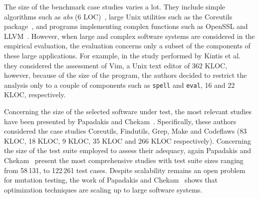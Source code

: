 
The size of the benchmark case studies varies a lot. They include simple algorithms such as \textit{abs} (6 LOC)~\cite{tokumoto2016muvm}, large Unix utilities such as the Coreutils package~\cite{hariri2019comparing,papadakis2018mutation,chekam2017empirical}, and programs implementing complex functions such as OpenSSL and LLVM~\cite{denisov2018mull}.
However, when large and complex software systems are considered in the empirical evaluation, the evaluation concerns only a subset of the components of these large applications.
For example, in the study performed by Kintis et al.~\cite{kintis2017detecting} they considered the assessment of Vim, a Unix text editor of 362 KLOC, however, because of the size of the program, the authors decided to restrict the analysis only to a couple of components such as \texttt{spell} and \texttt{eval}, 16 and 22 KLOC, respectively. 


Concerning the size of the selected software under test, the most relevant studies have been presented by Papadakis and Chekam~\cite{papadakis2018mutation,chekam2017empirical,papadakis2018mutant}. Specifically, these authors considered the case studies Coreutils, Findutils, Grep, Make and Codeflaws (83 KLOC, 18 KLOC, 9 KLOC, 35 KLOC and 266 KLOC respectively). 
Concerning the size of the test suite employed to assess their adequacy, again Papadakis and Chekam~\cite{papadakis2018mutation,chekam2017empirical,papadakis2018mutant} present the most comprehensive studies with test suite sizes ranging from 58\,131, to 122\,261 test cases.
Despite scalability remains an open problem for mutation testing, the work of Papadakis and Chekam~\cite{papadakis2018mutation,chekam2017empirical,papadakis2018mutant} shows that optimization techniques are scaling up to large software systems.

